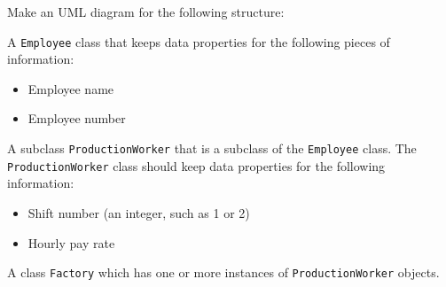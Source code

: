 Make an UML diagram for the following structure:

A \texttt{Employee} class that keeps data properties for the following pieces of information: 
\begin{itemize}
\item Employee name
\item Employee number
\end{itemize}

A subclass \texttt{ProductionWorker} that is a subclass of the \texttt{Employee} class. The \texttt{ProductionWorker} class should keep data properties for the following information:
\begin{itemize}
\item Shift number (an integer, such as 1 or 2)
\item Hourly pay rate
\end{itemize}

A class \texttt{Factory} which has one or more instances of \texttt{ProductionWorker} objects.

